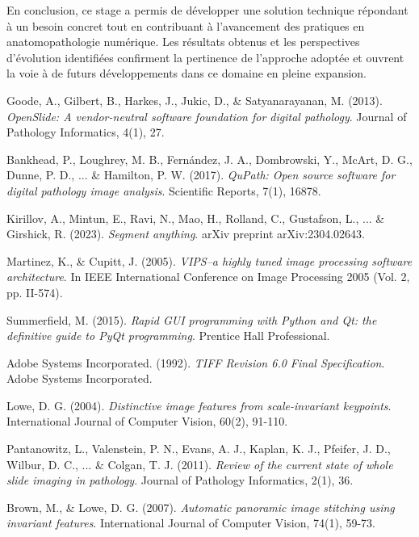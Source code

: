 \documentclass[12pt,a4paper]{report}
\begin{document}
\begin{}
\begin{}
\begin{}
\vspace{0.5em}

En conclusion, ce stage a permis de développer une solution technique répondant à un besoin concret tout en contribuant à l'avancement des pratiques en anatomopathologie numérique. Les résultats obtenus et les perspectives d'évolution identifiées confirment la pertinence de l'approche adoptée et ouvrent la voie à de futurs développements dans ce domaine en pleine expansion.

\begin{thebibliography}{20}

Goode, A., Gilbert, B., Harkes, J., Jukic, D., \& Satyanarayanan, M. (2013). 
\textit{OpenSlide: A vendor-neutral software foundation for digital pathology}. 
Journal of Pathology Informatics, 4(1), 27.

Bankhead, P., Loughrey, M. B., Fernández, J. A., Dombrowski, Y., McArt, D. G., Dunne, P. D., ... \& Hamilton, P. W. (2017). 
\textit{QuPath: Open source software for digital pathology image analysis}. 
Scientific Reports, 7(1), 16878.

Kirillov, A., Mintun, E., Ravi, N., Mao, H., Rolland, C., Gustafson, L., ... \& Girshick, R. (2023). 
\textit{Segment anything}. 
arXiv preprint arXiv:2304.02643.

Martinez, K., \& Cupitt, J. (2005). 
\textit{VIPS–a highly tuned image processing software architecture}. 
In IEEE International Conference on Image Processing 2005 (Vol. 2, pp. II-574).

Summerfield, M. (2015). 
\textit{Rapid GUI programming with Python and Qt: the definitive guide to PyQt programming}. 
Prentice Hall Professional.

Adobe Systems Incorporated. (1992). 
\textit{TIFF Revision 6.0 Final Specification}. 
Adobe Systems Incorporated.

Lowe, D. G. (2004). 
\textit{Distinctive image features from scale-invariant keypoints}. 
International Journal of Computer Vision, 60(2), 91-110.

Pantanowitz, L., Valenstein, P. N., Evans, A. J., Kaplan, K. J., Pfeifer, J. D., Wilbur, D. C., ... \& Colgan, T. J. (2011). 
\textit{Review of the current state of whole slide imaging in pathology}. 
Journal of Pathology Informatics, 2(1), 36.

Brown, M., \& Lowe, D. G. (2007). 
\textit{Automatic panoramic image stitching using invariant features}. 
International Journal of Computer Vision, 74(1), 59-73.


\end{thebibliography}
\end{}
\end{}
\end{}
\end{document}
